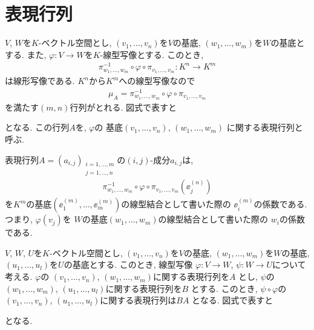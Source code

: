 \section{表現行列}
$V$, $W$を$K$-ベクトル空間とし,
$(v_1,\ldots,v_n)$を$V$の基底,
$(w_1,\ldots,w_m)$を$W$の基底とする.
また,
$\varphi\colon V\to W$を$K$-線型写像とする.
このとき,
\begin{align*}
  \pi^{-1}_{w_1,\ldots,w_m}\circ \varphi \circ \pi_{v_1,\ldots,v_m}
  \colon K^n\to K^m
\end{align*}
は線形写像である. 
$K^n$から$K^m$への線型写像なので
\begin{align*}
  \mu_{A}=\pi^{-1}_{w_1,\ldots,w_m}\circ \varphi \circ \pi_{v_1,\ldots,v_m}
\end{align*}
を満たす$(m,n)$行列がとれる.
図式で表すと
\begin{center}
\end{center}
となる.
この行列$A$を,
$\varphi$の
基底$(v_1,\ldots,v_n)$,
$(w_1,\ldots,w_m)$
に関する表現行列と呼ぶ.
\begin{remark}
表現行列$A=(a_{i,j})_{\substack{i=1,\ldots,m\\j=1,\ldots,n}}$の$(i,j)$-成分$a_{i,j}$は,
\begin{align*}
  \pi^{-1}_{w_1,\ldots,w_m}\circ \varphi \circ \pi_{v_1,\ldots,v_m}
  (\ee_j^{(n)})
\end{align*}
を$K^m$の基底$(\ee_1^{(m)},\ldots,\ee_m^{(m)})$の線型結合として書いた際の
$\ee_i^{(m)}$の係数である.
つまり,
$\varphi(v_j)$を
$W$の基底$(w_1,\ldots,w_m)$の線型結合として書いた際の
$w_i$の係数である.
\end{remark}
\begin{prop}
  \label{prop:repmatishom}
$V$, $W$, $U$を$K$-ベクトル空間とし,
$(v_1,\ldots,v_n)$を$V$の基底,
$(w_1,\ldots,w_m)$を$W$の基底,
$(u_1,\ldots,u_l)$を$U$の基底とする.
このとき, 線型写像
$\varphi\colon V\to W$,
$\psi\colon W\to U$について考える.
$\varphi$の
$(v_1,\ldots,v_n)$,
$(w_1,\ldots,w_m)$に関する表現行列を$A$
とし,
$\psi$の
$(w_1,\ldots,w_m)$,
$(u_1,\ldots,u_l)$に関する表現行列を$B$
とする.
このとき,
$\psi\circ \varphi$の
$(v_1,\ldots,v_n)$,
$(u_1,\ldots,u_l)$に関する表現行列は$BA$
となる.
図式で表すと
\begin{center}
\end{center}
となる.
\end{prop}
